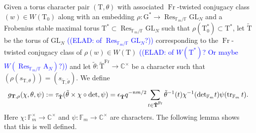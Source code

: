 \documentclass[12pt, reqno]{amsart}
\theoremstyle{definition}
\theoremstyle{definition}
\theoremstyle{definition}
\newcommand{\cComplex}{\mathbb{C}}
\newcommand{\multiplicativegroup}[1]{#1^{\times}}
\newcommand{\fieldCharacter}{\psi}
\newcommand{\trace}{\operatorname{tr}}
\newcommand{\GL}{\mathrm{GL}}
\newcommand{\finiteField}{\mathbb{F}}
\newcommand{\finiteFieldExtension}[1]{\finiteField_{#1}}
\newcommand{\Frobenius}{\operatorname{Fr}}
\newcommand{\restrictionOfScalars}[3]{\operatorname{Res}_{#1 \slash #2}{#3}}
\newcommand{\algebraicGroup}[1]{\boldsymbol{\mathrm{#1}}}
\newcommand{\elad}[1]{\textcolor{blue}{\sffamily ((ELAD: #1))}}
\begin{document}
Given a torus character pair $(\algebraicGroup{T},\theta)$ with associated $\Frobenius$-twisted conjugacy class $(w) \in W(\algebraicGroup{T}_0)$ along with an embedding $\rho:\algebraicGroup{G}^* \to \restrictionOfScalars{\finiteFieldExtension{m}}{\finiteField}{\algebraicGroup{\GL}_N}$ and a Frobenius stable maximal torus $\algebraicGroup{T}^* \subset \restrictionOfScalars{\finiteFieldExtension{m}}{\finiteField}{\algebraicGroup{\GL}_N}$ such that $\rho(\algebraicGroup{T}_0^*) \subset \algebraicGroup{T}^*$, let $\tilde{\algebraicGroup{T}}$ be the torus of $\algebraicGroup{\GL}_N$ \elad{of $\restrictionOfScalars{\finiteFieldExtension{m}}{\finiteField}{\algebraicGroup{\GL}_N}$?} corresponding to the $\Frobenius$-twisted conjugacy class of $\rho(w) \in W(\algebraicGroup{T})$ \elad{of $W\left(\algebraicGroup{T}^{\ast}\right)$? Or maybe $W\left(\restrictionOfScalars{\finiteFieldExtension{m}}{\finiteField}{\algebraicGroup{A}_N}\right)$?} and let $\tilde{\theta} \colon \tilde{\algebraicGroup{T}}^{\Frobenius} \to \multiplicativegroup{\cComplex}$ be a character such that $(\rho(s_{\algebraicGroup{T},\theta})) = (s_{\tilde{\algebraicGroup{T}},\tilde{\theta}})$. We define
\[
    g_{\algebraicGroup{T},\rho}(\chi,\theta,\psi) := \tau_{\Tilde{\algebraicGroup{T}}}(\tilde{\theta} \times \chi \circ \det,\psi) = \epsilon_{\Tilde{\algebraicGroup{T}}} q^{-nm/2}\sum_{t \in \tilde{\algebraicGroup{T}}^{\Frobenius}} \tilde{\theta}^{-1}(t)\chi^{-1}({\det}_{\finiteFieldExtension{m}}t) \psi(\trace_{\finiteFieldExtension{m}}t).
\]
Here $\chi \colon \multiplicativegroup{\finiteFieldExtension{m}} \to \multiplicativegroup{\cComplex}$ and $\fieldCharacter \colon \finiteFieldExtension{m} \to \multiplicativegroup{\cComplex}$ are characters. The following lemma shows that this is well defined.
\end{document}
